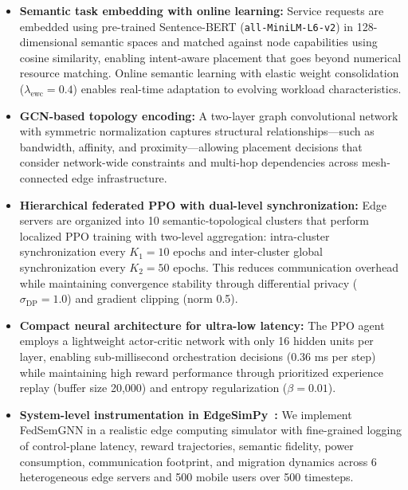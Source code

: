 \begin{itemize}
	\item \textbf{Semantic task embedding with online learning:} Service requests are embedded using pre-trained Sentence-BERT (\texttt{all-MiniLM-L6-v2}) in 128-dimensional semantic spaces and matched against node capabilities using cosine similarity, enabling intent-aware placement that goes beyond numerical resource matching. Online semantic learning with elastic weight consolidation ($\lambda_{\text{ewc}} = 0.4$) enables real-time adaptation to evolving workload characteristics.
	
	\item \textbf{GCN-based topology encoding:} A two-layer graph convolutional network with symmetric normalization captures structural relationships—such as bandwidth, affinity, and proximity—allowing placement decisions that consider network-wide constraints and multi-hop dependencies across mesh-connected edge infrastructure.
	
	\item \textbf{Hierarchical federated PPO with dual-level synchronization:} Edge servers are organized into 10 semantic-topological clusters that perform localized PPO training with two-level aggregation: intra-cluster synchronization every $K_1 = 10$ epochs and inter-cluster global synchronization every $K_2 = 50$ epochs. This reduces communication overhead while maintaining convergence stability through differential privacy ($\sigma_{\text{DP}} = 1.0$) and gradient clipping (norm 0.5).
	
	\item \textbf{Compact neural architecture for ultra-low latency:} The PPO agent employs a lightweight actor-critic network with only 16 hidden units per layer, enabling sub-millisecond orchestration decisions (0.36 ms per step) while maintaining high reward performance through prioritized experience replay (buffer size 20,000) and entropy regularization ($\beta = 0.01$).
	
	\item \textbf{System-level instrumentation in EdgeSimPy~\cite{edgesimpy}:} We implement FedSemGNN in a realistic edge computing simulator with fine-grained logging of control-plane latency, reward trajectories, semantic fidelity, power consumption, communication footprint, and migration dynamics across 6 heterogeneous edge servers and 500 mobile users over 500 timesteps.
	

\end{itemize}
